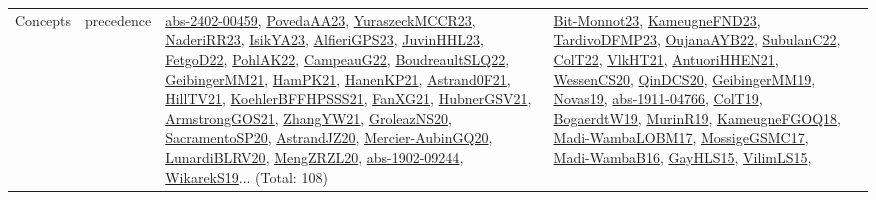 {\begin{longtable}{lp{3cm}>{\raggedright}p{6cm}>{\raggedright}p{6cm}p{8cm}}
Concepts & precedence & \href{articles/abs-2402-00459.pdf}{abs-2402-00459}\cite{abs-2402-00459}, \href{papers/PovedaAA23.pdf}{PovedaAA23}\cite{PovedaAA23}, \href{articles/YuraszeckMCCR23.pdf}{YuraszeckMCCR23}\cite{YuraszeckMCCR23}, \href{articles/NaderiRR23.pdf}{NaderiRR23}\cite{NaderiRR23}, \href{articles/IsikYA23.pdf}{IsikYA23}\cite{IsikYA23}, \href{articles/AlfieriGPS23.pdf}{AlfieriGPS23}\cite{AlfieriGPS23}, \href{papers/JuvinHHL23.pdf}{JuvinHHL23}\cite{JuvinHHL23}, \href{articles/FetgoD22.pdf}{FetgoD22}\cite{FetgoD22}, \href{articles/PohlAK22.pdf}{PohlAK22}\cite{PohlAK22}, \href{articles/CampeauG22.pdf}{CampeauG22}\cite{CampeauG22}, \href{papers/BoudreaultSLQ22.pdf}{BoudreaultSLQ22}\cite{BoudreaultSLQ22}, \href{papers/GeibingerMM21.pdf}{GeibingerMM21}\cite{GeibingerMM21}, \href{articles/HamPK21.pdf}{HamPK21}\cite{HamPK21}, \href{papers/HanenKP21.pdf}{HanenKP21}\cite{HanenKP21}, \href{papers/Astrand0F21.pdf}{Astrand0F21}\cite{Astrand0F21}, \href{papers/HillTV21.pdf}{HillTV21}\cite{HillTV21}, \href{articles/KoehlerBFFHPSSS21.pdf}{KoehlerBFFHPSSS21}\cite{KoehlerBFFHPSSS21}, \href{articles/FanXG21.pdf}{FanXG21}\cite{FanXG21}, \href{articles/HubnerGSV21.pdf}{HubnerGSV21}\cite{HubnerGSV21}, \href{papers/ArmstrongGOS21.pdf}{ArmstrongGOS21}\cite{ArmstrongGOS21}, \href{articles/ZhangYW21.pdf}{ZhangYW21}\cite{ZhangYW21}, \href{papers/GroleazNS20.pdf}{GroleazNS20}\cite{GroleazNS20}, \href{articles/SacramentoSP20.pdf}{SacramentoSP20}\cite{SacramentoSP20}, \href{articles/AstrandJZ20.pdf}{AstrandJZ20}\cite{AstrandJZ20}, \href{papers/Mercier-AubinGQ20.pdf}{Mercier-AubinGQ20}\cite{Mercier-AubinGQ20}, \href{articles/LunardiBLRV20.pdf}{LunardiBLRV20}\cite{LunardiBLRV20}, \href{articles/MengZRZL20.pdf}{MengZRZL20}\cite{MengZRZL20}, \href{articles/abs-1902-09244.pdf}{abs-1902-09244}\cite{abs-1902-09244}, \href{articles/WikarekS19.pdf}{WikarekS19}\cite{WikarekS19}... (Total: 108) & \href{papers/Bit-Monnot23.pdf}{Bit-Monnot23}\cite{Bit-Monnot23}, \href{papers/KameugneFND23.pdf}{KameugneFND23}\cite{KameugneFND23}, \href{papers/TardivoDFMP23.pdf}{TardivoDFMP23}\cite{TardivoDFMP23}, \href{papers/OujanaAYB22.pdf}{OujanaAYB22}\cite{OujanaAYB22}, \href{articles/SubulanC22.pdf}{SubulanC22}\cite{SubulanC22}, \href{articles/ColT22.pdf}{ColT22}\cite{ColT22}, \href{articles/VlkHT21.pdf}{VlkHT21}\cite{VlkHT21}, \href{papers/AntuoriHHEN21.pdf}{AntuoriHHEN21}\cite{AntuoriHHEN21}, \href{papers/WessenCS20.pdf}{WessenCS20}\cite{WessenCS20}, \href{articles/QinDCS20.pdf}{QinDCS20}\cite{QinDCS20}, \href{papers/GeibingerMM19.pdf}{GeibingerMM19}\cite{GeibingerMM19}, \href{articles/Novas19.pdf}{Novas19}\cite{Novas19}, \href{articles/abs-1911-04766.pdf}{abs-1911-04766}\cite{abs-1911-04766}, \href{papers/ColT19.pdf}{ColT19}\cite{ColT19}, \href{papers/BogaerdtW19.pdf}{BogaerdtW19}\cite{BogaerdtW19}, \href{papers/MurinR19.pdf}{MurinR19}\cite{MurinR19}, \href{papers/KameugneFGOQ18.pdf}{KameugneFGOQ18}\cite{KameugneFGOQ18}, \href{papers/Madi-WambaLOBM17.pdf}{Madi-WambaLOBM17}\cite{Madi-WambaLOBM17}, \href{papers/MossigeGSMC17.pdf}{MossigeGSMC17}\cite{MossigeGSMC17}, \href{papers/Madi-WambaB16.pdf}{Madi-WambaB16}\cite{Madi-WambaB16}, \href{papers/GayHLS15.pdf}{GayHLS15}\cite{GayHLS15}, \href{papers/VilimLS15.pdf}{VilimLS15}\cite{VilimLS15}, 
\end{longtable}}
